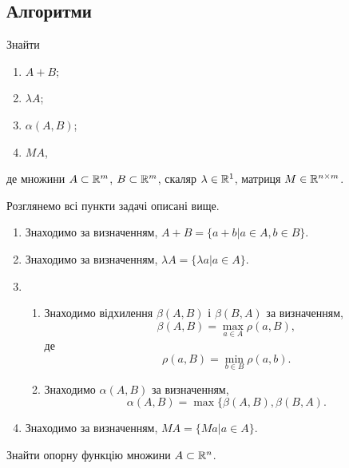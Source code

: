 \subsection{Алгоритми}

\begin{problem*}
	Знайти
	\begin{enumerate}
		\item $A+B$;
		\item $\lambda A$;
		\item $\alpha(A,B)$;
		\item $MA$,
	\end{enumerate}
	де множини $A \subset\mathbb{R}^m$, $B\subset\mathbb{R}^m$, скаляр $\lambda\in\mathbb{R}^1$, матриця $M\in\mathbb{R}^{n\times m}$.
\end{problem*}

\begin{algorithm}
	\label{algo-2-1}
	Розглянемо всі пункти задачі описані вище.
	\begin{enumerate}
		\item Знаходимо за визначенням, $A+B=\{a+b|a\in A,b\in B\}$.
		\item Знаходимо за визначенням, $\lambda A =\{\lambda a|a\in A\}$. 
		\item \begin{enumerate}
			\item Знаходимо відхилення $\beta(A,B)$ і $\beta(B,A)$ за визначенням, 
			\begin{equation}
				\label{eq:2.1}
				\beta(A,B) = \max_{a\in A}\rho(a,B),
			\end{equation}
			де 
			\begin{equation}
				\label{eq:2.2}
				\rho(a,B) = \min_{b\in B} \rho(a,b).
			\end{equation}
			\item Знаходимо $\alpha(A,B)$ за визначенням, 
			\begin{equation}
				\label{eq:2.3}
				\alpha(A,B)=\max\{\beta(A,B),\beta(B,A).
			\end{equation}
		\end{enumerate} 
		\item Знаходимо за визначенням, $MA=\{Ma|a\in A\}$.
	\end{enumerate}
\end{algorithm}

\vspace*{\baselineskip}

\begin{problem*}
	Знайти опорну функцію множини $A \subset \mathbb{R}^n$.
\end{problem*}

